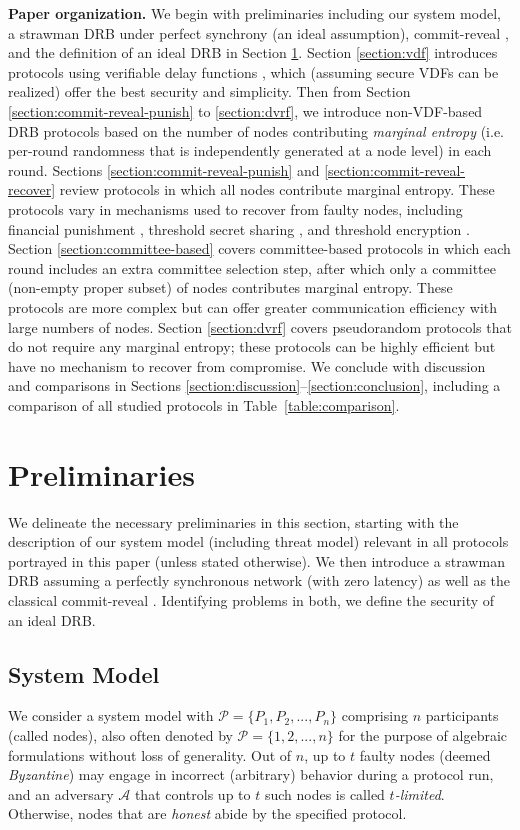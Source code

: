 \documentclass[conference]{IEEEtran}
\theoremstyle{definition}
\theoremstyle{remark}
\begin{document}
\textbf{Paper organization.} We begin with preliminaries including our system model, a strawman DRB under perfect synchrony (an ideal assumption), commit-reveal \cite{blum1983coin}, and the definition of an ideal DRB in Section \ref{section:preliminaries}. Section \ref{section:vdf} introduces protocols using verifiable delay functions \cite{boneh2018verifiable}, which (assuming secure VDFs can be realized) offer the best security and simplicity. Then from Section \ref{section:commit-reveal-punish} to \ref{section:dvrf}, we introduce non-VDF-based DRB protocols based on the number of nodes contributing \textit{marginal entropy} (i.e. per-round randomness that is independently generated at a node level) in each round. Sections \ref{section:commit-reveal-punish} and \ref{section:commit-reveal-recover} review protocols in which all nodes contribute marginal entropy. These protocols vary in mechanisms used to recover from faulty nodes, including financial punishment \cite{youcai2017randao, david2020economically}, threshold secret sharing \cite{schoenmakers1999simple, cascudo2017scrape}, and threshold encryption \cite{desmedt1990Threshold}. Section \ref{section:committee-based} covers committee-based protocols in which each round includes an extra committee selection step, after which only a committee (non-empty proper subset) of nodes contributes marginal entropy. These protocols are more complex but can offer greater communication efficiency with large numbers of nodes. Section \ref{section:dvrf} covers pseudorandom protocols that do not require any marginal entropy; these protocols can be highly efficient but have no mechanism to recover from compromise. We conclude with discussion and comparisons in Sections \ref{section:discussion}--\ref{section:conclusion}, including a comparison of all studied protocols in Table~\ref{table:comparison}.

\section{Preliminaries}
\label{section:preliminaries}
We delineate the necessary preliminaries in this section, starting with the description of our system model (including threat model) relevant in all protocols portrayed in this paper (unless stated otherwise). We then introduce a strawman DRB assuming a perfectly synchronous network (with zero latency) as well as the classical commit-reveal \cite{blum1983coin}. Identifying problems in both, we define the security of an ideal DRB.

\subsection{System Model}
We consider a system model with $\mathcal{P} = \{P_1, P_2, ..., P_n\}$ comprising $n$ participants (called nodes), also often denoted by $\mathcal{P} = \{1, 2, ..., n\}$ for the purpose of algebraic formulations without loss of generality. Out of $n$, up to $t$ faulty nodes (deemed \textit{Byzantine}) may engage in incorrect (arbitrary) behavior during a protocol run, and an adversary $\mathcal{A}$ that controls up to $t$ such nodes is called \textit{$t$-limited}. Otherwise, nodes that are \textit{honest} abide by the specified protocol.
\end{document}
